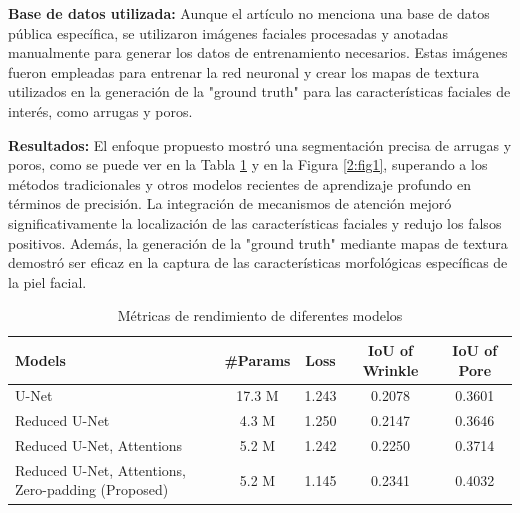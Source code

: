 \textbf{Base de datos utilizada:}
Aunque el artículo no menciona una base de datos pública específica, se utilizaron imágenes faciales procesadas y anotadas manualmente para generar los datos de entrenamiento necesarios. Estas imágenes fueron empleadas para entrenar la red neuronal y crear los mapas de textura utilizados en la generación de la "ground truth" para las características faciales de interés, como arrugas y poros.

\textbf{Resultados:}
El enfoque propuesto mostró una segmentación precisa de arrugas y poros, como se puede ver en la Tabla \ref{tab:models_performance} y en la Figura \ref{2:fig1}, superando a los métodos tradicionales y otros modelos recientes de aprendizaje profundo en términos de precisión. La integración de mecanismos de atención mejoró significativamente la localización de las características faciales y redujo los falsos positivos. Además, la generación de la "ground truth" mediante mapas de textura demostró ser eficaz en la captura de las características morfológicas específicas de la piel facial.

\begin{table}[h!]
    \centering
    \caption{Métricas de rendimiento de diferentes modelos}
    \renewcommand{\arraystretch}{1.2} %
    \setlength{\tabcolsep}{5pt} %
    \begin{tabularx}{\textwidth}{@{}X c c c c@{}}
        \toprule
        \textbf{Models} & \textbf{\#Params} & \textbf{Loss} & \textbf{IoU of Wrinkle} & \textbf{IoU of Pore} \\ \midrule
        U-Net & 17.3 M & 1.243 & 0.2078 & 0.3601 \\
        Reduced U-Net & 4.3 M & 1.250 & 0.2147 & 0.3646 \\
        Reduced U-Net, Attentions & 5.2 M & 1.242 & 0.2250 & 0.3714 \\
        Reduced U-Net, Attentions, Zero-padding (Proposed) & 5.2 M & 1.145 & 0.2341 & 0.4032 \\ 
        \bottomrule
    \end{tabularx}
    \label{tab:models_performance}
\end{table}



